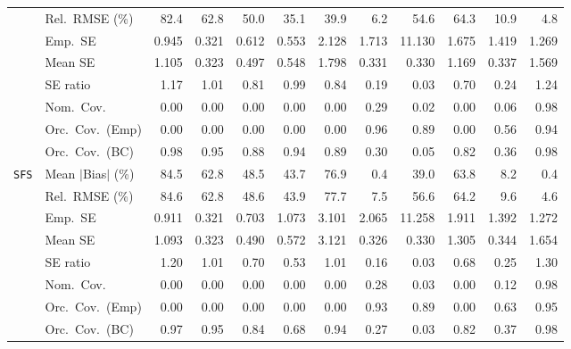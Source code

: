 \begin{landscape}
\begin{longtable}{llrrrrrrrrrr}
 & Rel.\ RMSE (\%) & 82.4 & 62.8 & 50.0 & 35.1 & 39.9 & \cellcolor{ranktwo}6.2 & 54.6 & 64.3 & \cellcolor{rankthree}10.9 & \cellcolor{rankone}4.8 \\
 & Emp.\ SE & 0.945 & 0.321 & 0.612 & 0.553 & 2.128 & 1.713 & 11.130 & 1.675 & 1.419 & 1.269 \\
 & Mean SE & 1.105 & 0.323 & 0.497 & 0.548 & 1.798 & 0.331 & 0.330 & 1.169 & 0.337 & 1.569 \\
 & SE ratio & \cellcolor{rankthree}1.17 & \cellcolor{rankone}1.01 & 0.81 & \cellcolor{rankone}0.99 & \cellcolor{ranktwo}0.84 & 0.19 & 0.03 & 0.70 & 0.24 & 1.24 \\
 & Nom.\ Cov. & 0.00 & 0.00 & 0.00 & 0.00 & 0.00 & \cellcolor{ranktwo}0.29 & 0.02 & 0.00 & \cellcolor{rankthree}0.06 & \cellcolor{rankone}0.98 \\
 & Orc.\ Cov.\ (Emp) & 0.00 & 0.00 & 0.00 & 0.00 & 0.00 & \cellcolor{rankone}0.96 & \cellcolor{ranktwo}0.89 & 0.00 & \cellcolor{rankthree}0.56 & \cellcolor{rankone}0.94 \\
 & Orc.\ Cov.\ (BC) & \cellcolor{rankthree}0.98 & \cellcolor{rankone}0.95 & 0.88 & \cellcolor{ranktwo}0.94 & 0.89 & 0.30 & 0.05 & 0.82 & 0.36 & \cellcolor{rankthree}0.98 \\
\addlinespace[2pt]
\quad \texttt{SFS} & Mean $|$Bias$|$ (\%) & 84.5 & 62.8 & 48.5 & 43.7 & 76.9 & \cellcolor{rankone}0.4 & \cellcolor{rankthree}39.0 & 63.8 & \cellcolor{ranktwo}8.2 & \cellcolor{rankone}0.4 \\
 & Rel.\ RMSE (\%) & 84.6 & 62.8 & 48.6 & 43.9 & 77.7 & \cellcolor{ranktwo}7.5 & 56.6 & 64.2 & \cellcolor{rankthree}9.6 & \cellcolor{rankone}4.6 \\
 & Emp.\ SE & 0.911 & 0.321 & 0.703 & 1.073 & 3.101 & 2.065 & 11.258 & 1.911 & 1.392 & 1.272 \\
 & Mean SE & 1.093 & 0.323 & 0.490 & 0.572 & 3.121 & 0.326 & 0.330 & 1.305 & 0.344 & 1.654 \\
 & SE ratio & \cellcolor{ranktwo}1.20 & \cellcolor{rankone}1.01 & \cellcolor{rankthree}0.70 & 0.53 & \cellcolor{rankone}1.01 & 0.16 & 0.03 & 0.68 & 0.25 & \cellcolor{rankthree}1.30 \\
 & Nom.\ Cov. & 0.00 & 0.00 & 0.00 & 0.00 & 0.00 & \cellcolor{ranktwo}0.28 & 0.03 & 0.00 & \cellcolor{rankthree}0.12 & \cellcolor{rankone}0.98 \\
 & Orc.\ Cov.\ (Emp) & 0.00 & 0.00 & 0.00 & 0.00 & 0.00 & \cellcolor{ranktwo}0.93 & \cellcolor{rankthree}0.89 & 0.00 & 0.63 & \cellcolor{rankone}0.95 \\
 & Orc.\ Cov.\ (BC) & \cellcolor{rankthree}0.97 & \cellcolor{rankone}0.95 & 0.84 & 0.68 & \cellcolor{ranktwo}0.94 & 0.27 & 0.03 & 0.82 & 0.37 & 0.98 \\

\end{longtable}
\end{landscape}
